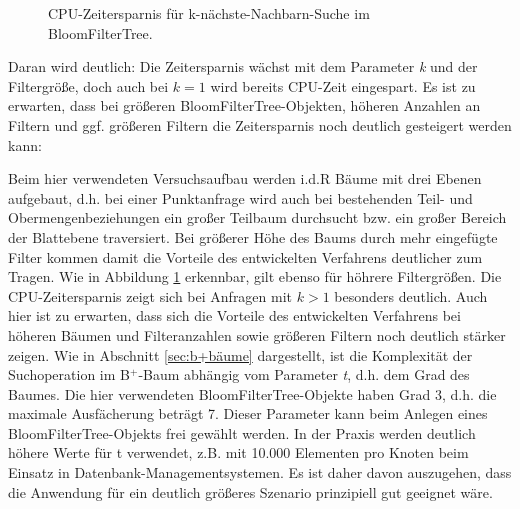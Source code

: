\begin{figure}[hpbt]
  \hspace{0.01\textwidth}
 \caption[CPU-Zeitersparnis für k-nächste-Nachbarn-Suche im BloomFilterTree]{CPU-Zeitersparnis für k-nächste-Nachbarn-Suche im BloomFilterTree.}
 \label{fig:multipic1} %
\end{figure}
Daran wird deutlich: Die Zeitersparnis wächst mit dem Parameter \textit{k} und der Filtergröße, doch auch bei $k=1$ wird bereits CPU-Zeit eingespart. Es ist zu erwarten, dass bei größeren BloomFilterTree-Objekten, höheren Anzahlen an Filtern und ggf. größeren Filtern die Zeitersparnis noch deutlich gesteigert werden kann: 

Beim hier verwendeten Versuchsaufbau werden i.d.R Bäume mit drei Ebenen aufgebaut, d.h. bei einer Punktanfrage wird auch bei bestehenden Teil- und Obermengenbeziehungen ein großer Teilbaum durchsucht bzw. ein großer Bereich der Blattebene traversiert. Bei größerer Höhe des Baums durch mehr eingefügte Filter kommen damit die Vorteile des entwickelten Verfahrens deutlicher zum Tragen. Wie in Abbildung \ref{fig:multipic1} erkennbar, gilt ebenso für höhrere Filtergrößen. Die CPU-Zeitersparnis zeigt sich bei Anfragen mit $k>1$ besonders deutlich. Auch hier ist zu erwarten, dass sich die Vorteile des entwickelten Verfahrens bei höheren Bäumen und Filteranzahlen sowie größeren Filtern noch deutlich stärker zeigen.
\newpage
\noindent
Wie in Abschnitt \ref{sec:b+bäume} dargestellt, ist die Komplexität der Suchoperation im B$^+$-Baum abhängig vom Parameter \textit{t}, d.h. dem Grad des Baumes. Die hier verwendeten BloomFilterTree-Objekte haben Grad 3, d.h. die maximale Ausfächerung beträgt 7. Dieser Parameter kann beim Anlegen eines BloomFilterTree-Objekts frei gewählt werden. In der Praxis werden deutlich höhere Werte für t verwendet, z.B. mit 10.000 Elementen pro Knoten beim Einsatz in Datenbank-Managementsystemen. Es ist daher davon auszugehen, dass die Anwendung für ein deutlich größeres Szenario prinzipiell gut geeignet wäre.  
